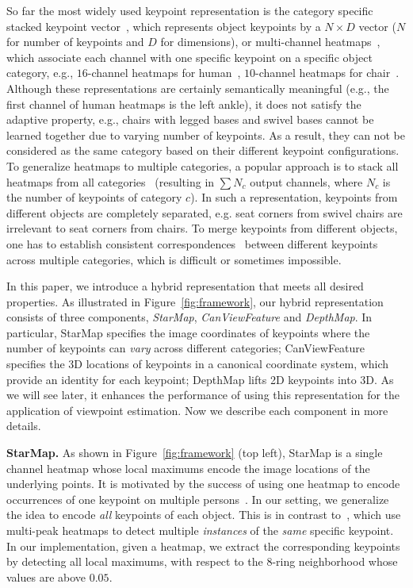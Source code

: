 \documentclass[runningheads]{llncs}
\begin{document}
So far the most widely used keypoint representation is the category specific stacked keypoint vector~\cite{toshev2014deeppose}, which represents object keypoints by a $N \times D$ vector ($N$ for number of keypoints and $D$ for dimensions), or multi-channel heatmaps~\cite{tompson2014joint,newell2016stacked}, which associate each channel with one specific keypoint on a specific object category, e.g., $16$-channel heatmaps for human~\cite{tompson2014joint,newell2016stacked}, $10$-channel heatmaps for chair~\cite{wu2016single}.
Although these representations are certainly semantically meaningful (e.g., the first channel of human heatmaps is the left ankle), it does not satisfy the adaptive property, e.g., chairs with legged bases and swivel bases cannot be learned together due to varying number of keypoints.
As a result, they can not be considered as the same category based on their different keypoint configurations.
To generalize heatmaps to multiple categories, 
a popular approach is to stack all heatmaps from all categories~\cite{tulsiani2015viewpoints,pavlakos20176} (resulting in $\sum{N_c}$ output channels, where $N_c$ is the number of keypoints of category $c$).
In such a representation, keypoints from different objects are completely separated,
e.g. seat corners from swivel chairs are irrelevant to seat corners from chairs. To merge keypoints from different objects, one has to establish consistent correspondences~\cite{zhou2016learning} between different keypoints across multiple categories, which is difficult or sometimes impossible.

In this paper, we introduce a hybrid representation that meets all desired properties. 
As illustrated in Figure~\ref{fig:framework}, our hybrid representation consists of three components, \emph{StarMap}, \emph{CanViewFeature} and \emph{DepthMap}. 
In particular, StarMap specifies the image coordinates of keypoints where the number of keypoints can \emph{vary} across different categories; 
CanViewFeature specifies the 3D locations of keypoints in a canonical coordinate system, which provide an identity for each keypoint; 
DepthMap lifts 2D keypoints into 3D. As we will see later, it enhances the performance of using this representation for the application of viewpoint estimation. 
Now we describe each component in more details.


\noindent\textbf{StarMap.} As shown in Figure~\ref{fig:framework} (top left), StarMap is a single channel heatmap whose local maximums encode the image locations of the underlying points. 
It is motivated by the success of using one heatmap to encode occurrences of one keypoint on multiple persons~\cite{cao2017realtime,newell2017associative}. 
In our setting, we generalize the idea to encode \emph{all} keypoints of each object.
This is in contrast to~\cite{cao2017realtime,newell2017associative}, which use multi-peak heatmaps to detect multiple \emph{instances} of the \emph{same} specific keypoint. In our implementation, given a heatmap, we extract the corresponding keypoints by detecting all local maximums, with respect to the 8-ring neighborhood whose values are above $0.05$. 
\end{document}
